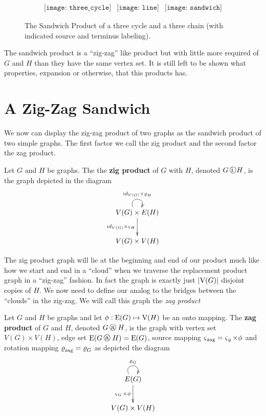 \begin{figure}[h!]
\centering
\begin{minipage}{.85\textwidth}
\[
\begin{array}{ccc}
\texttt{[image: three\_cycle]} &  
\texttt{[image: line]} & 
\texttt{[image: sandwich]} 
\end{array}
\]
\caption{The Sandwich Product of a three cycle and a three chain (with indicated source and terminus labeling). \label{fig:sandwich}}
\end{minipage}
\end{figure}

The sandwich product is a ``zig-zag'' like product but with little more required of $G$ and $H$ than they have the same vertex set. It is still left to be shown what properties, expansion or otherwise, that this products has. 


\section{A Zig-Zag Sandwich}
\label{sec:zig-zag-sandwich}
We now can display the zig-zag product of two graphs as the sandwich product of two simple graphs. 
The first factor we call the zig product and the second factor the zag product.  

\begin{definition}
\label{def:graph:zig} 
Let $G$ and $H$ be graphs. The the \textbf{zig product} of $G$ with $H$, denoted $G \zig H$,  is the graph depicted in the diagram
\[ 
\xymatrix{
  {V(G) \times E(H)} \ar[d]_{id_{V(G)} \times \Source_{H}}  \ar@(ul,ur)^{id_{V(G)} \times \Rot_{H}}  \\
     {V(G) \times V(H)}
}
\]
\end{definition}
The zig product graph will lie at the beginning and end of our product much like how we start and end in a ``cloud'' when we traverse the replacement product graph in a ``zig-zag'' fashion. In fact the graph is exactly just $\left\vert \mathrm{V}(G) \right\vert$ disjoint copies of $H$. We now need to define our analog to the bridges between the ``clouds'' in the zig-zag. We will call this graph the {\em zag product}
\begin{definition} 
\label{def:symnet:zag}
Let $G$ and $H$ be graphs and let $\phi:\mathrm{E}(G)  \mapsto \mathrm{V}(H)$ be an onto mapping. The {\bf zag product} of $G$ and $H$, denoted $G \zag H$, is the graph with  vertex set $V(G) \times V(H)$, 
edge set $\edgeS{G \zag H} = \edgeS{G}$, source mapping $\operatorname{\mathbf{\varsigma}}_{\rm zag} = \operatorname{\mathbf{\varsigma}}_{g} \times \phi$ and rotation mapping $\operatorname{\mathbf{\varrho}}_{\rm zag} = \operatorname{\mathbf{\varrho}}_{G}$ as depicted the diagram 
\[
\xymatrix{
  {E(G)} \ar[d]_{\Source_{G} \times \phi} \ar@(ul,ur)^{\Rot_{G}}  \\
  V(G) \times V(H)
}
\]
\end{definition}

